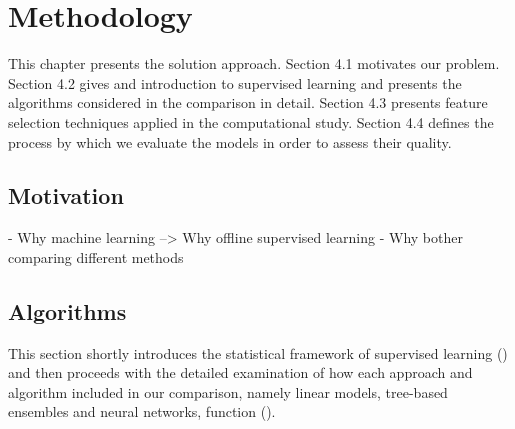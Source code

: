 

\chapter{Methodology}
This chapter presents the solution approach.
Section 4.1 motivates our problem. 
Section 4.2 gives and introduction to supervised learning and presents the algorithms considered in the comparison in detail.
Section 4.3 presents feature selection techniques applied in the computational study. 
Section 4.4 defines the process by which we evaluate the models in order to assess their quality.

\section{Motivation}

- Why machine learning --> Why offline supervised learning 
\newline
- Why bother comparing different methods 

\section{Algorithms}

This section shortly introduces the statistical framework of supervised learning (\cite{SLFoundations}) and then proceeds with the detailed examination of how each approach and algorithm included in our comparison, namely linear models, tree-based ensembles and neural networks, function (\cite{friedman2001elements}).


